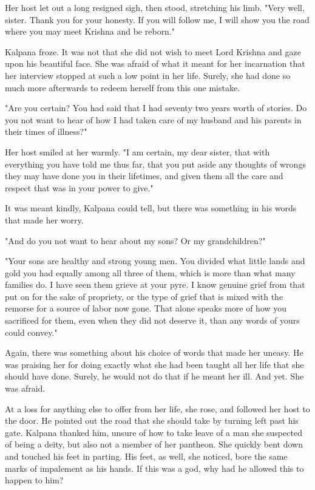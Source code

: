\documentclass{amsart}
\begin{document}
	Her host let out a long resigned sigh, then stood, stretching his limb. "Very
	well, sister. Thank you for your honesty. If you will follow me, I will show you	the road where you may meet Krishna and be reborn."
	
	Kalpana froze. It was not that she did not wish to meet Lord Krishna and gaze
	upon his beautiful face. She was afraid of what it meant for her incarnation
	that her interview stopped at such a low point in her life. Surely, she had done so much more afterwards to redeem herself from this one mistake.
	
	"Are you certain? You had said that I had seventy two years worth of stories. Do
	you not want to hear of how I had taken care of my husband and his parents in
	their times of illness?"
	
	Her host smiled at her warmly. "I am certain, my dear sister, that with
	everything you have told me thus far, that you put aside any thoughts of wrongs they may have done you in their lifetimes, and given them all the care and respect that was in your power to give."
	
	It was meant kindly, Kalpana could tell, but there was something in his words
	that made her worry. 
	
	"And do you not want to hear about my sons? Or my grandchildren?"
	
	"Your sons are healthy and strong young men. You divided what little lands and	gold you had equally among all three of them, which is more than what many families do. I have seen them grieve at your pyre. I know genuine grief from that put on for the sake of propriety, or the type of grief that is mixed with the remorse for a source of labor now gone. That alone speaks more of how you sacrificed for them, even when they
	did not deserve it, than any words of yours could convey."
	
	Again, there was something about his choice of words that made her uneasy. He
	was praising her for doing exactly what she had been taught all her life that
	she should have done. Surely, he would not do that if he meant her ill. And yet. She was afraid.
	
	At a loss for anything else to offer from her life, she rose, and followed her	host to the door. He pointed out the road that she should take by turning left past his gate. Kalpana thanked him, unsure of how to take leave of a man she suspected of being a deity, but also not a member of her pantheon. She quickly bent down and touched his feet in parting. His feet, as well, she noticed, bore the same marks of impalement as his hands. If this was a god, why had he allowed this to happen to him?
	
\end{document}
